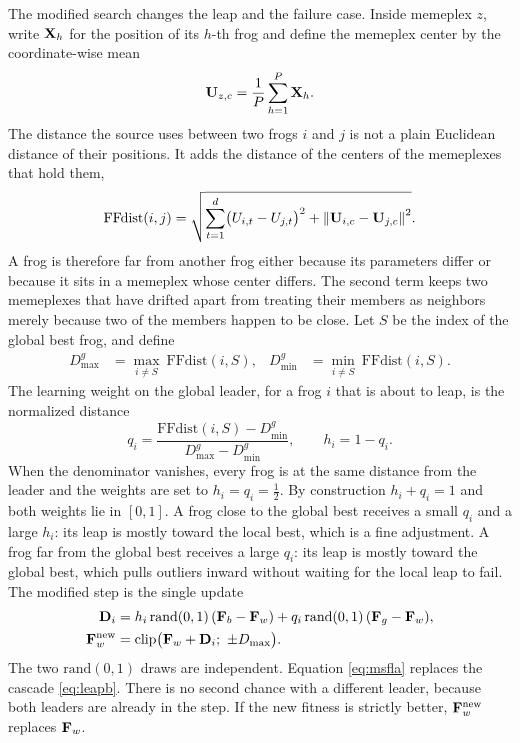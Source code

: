 The modified search changes the leap and the failure case.
Inside memeplex \(z\), write \(\mathbf{X}_{h}\) for the position of its \(h\)-th frog and define the memeplex center by the coordinate-wise mean
\begin{equation}
\mathbf{U}_{z,c}=\frac{1}{P}\sum_{h=1}^{P}\mathbf{X}_{h}.
\label{eq:center}
\end{equation}
The distance the source uses between two frogs \(i\) and \(j\) is not a plain Euclidean distance of their positions.
It adds the distance of the centers of the memeplexes that hold them,
\begin{equation}
\mathrm{FFdist}(i, j)
=\sqrt{\sum_{t=1}^{d}\bigl(U_{i,t}-U_{j,t}\bigr)^{2}
+\left\lVert \mathbf{U}_{i,c}-\mathbf{U}_{j,c} \right\rVert^{2}}.
\label{eq:ffdist}
\end{equation}
A frog is therefore far from another frog either because its parameters differ or because it sits in a memeplex whose center differs.
The second term keeps two memeplexes that have drifted apart from treating their members as neighbors merely because two of the members happen to be close.
Let \(S\) be the index of the global best frog, and define
\begin{align}
D_{\max}^{g}&=\max_{i\neq S}\ \mathrm{FFdist}(i, S),&
D_{\min}^{g}&=\min_{i\neq S}\ \mathrm{FFdist}(i, S).
\label{eq:dminmax}
\end{align}
The learning weight on the global leader, for a frog \(i\) that is about to leap, is the normalized distance
\begin{equation}
q_{i}=\frac{\mathrm{FFdist}(i, S)-D_{\min}^{g}}{D_{\max}^{g}-D_{\min}^{g}},
\qquad h_{i}=1-q_{i}.
\label{eq:qh}
\end{equation}
When the denominator vanishes, every frog is at the same distance from the leader and the weights are set to \(h_{i}=q_{i}=\tfrac12\).
By construction \(h_{i}+q_{i}=1\) and both weights lie in \([0,1]\).
A frog close to the global best receives a small \(q_{i}\) and a large \(h_{i}\): its leap is mostly toward the local best, which is a fine adjustment.
A frog far from the global best receives a large \(q_{i}\): its leap is mostly toward the global best, which pulls outliers inward without waiting for the local leap to fail.
The modified step is the single update
\begin{equation}
\begin{aligned}
\mathbf{D}_{i}
&=h_{i}\,\mathrm{rand}(0,1)\,(\mathbf{F}_{b}-\mathbf{F}_{w})
+q_{i}\,\mathrm{rand}(0,1)\,(\mathbf{F}_{g}-\mathbf{F}_{w}),\\
\mathbf{F}_{w}^{\mathrm{new}}
&=\mathrm{clip}\bigl(\mathbf{F}_{w}+\mathbf{D}_{i};\ \pm D_{\max}\bigr).
\end{aligned}
\label{eq:msfla}
\end{equation}
The two \(\mathrm{rand}(0,1)\) draws are independent.
Equation \eqref{eq:msfla} replaces the cascade \eqref{eq:leapb}.
There is no second chance with a different leader, because both leaders are already in the step.
If the new fitness is strictly better, \(\mathbf{F}_{w}^{\mathrm{new}}\) replaces \(\mathbf{F}_{w}\).

